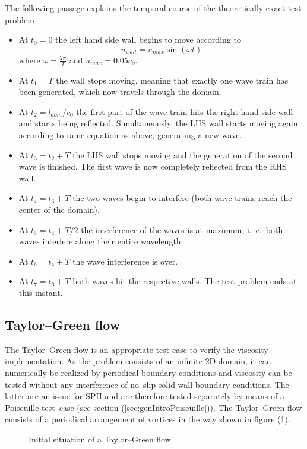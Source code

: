 \documentclass{report}
\begin{document}
The following passage explains the temporal course of the theoretically exact test problem

\begin{itemize} 
\item At $t_0=0$ the left hand side wall begins to move according to 
\begin{equation}
  u_{\mathit{wall}}=u_{\mathit{max}}\sin(\omega t) 
\end{equation}
  where $\omega=\frac{2\pi}{T}$ and $u_{\mathit{max}}=0.05 c_0$.


\item At $t_1=T$ the wall stops moving, meaning that exactly one wave train has been generated, which now travels through the domain.

\item At $t_2=l_{\mathit{dom}}/c_0$ the first part of the wave train hits the right hand side  wall and starts being reflected. Simultaneously, the LHS wall starts moving again according to same equation as above, generating a new wave.

\item At $t_3=t_2+T$ the LHS wall stops moving and the generation of the second wave is finished. 
The first wave is now completely reflected from the RHS wall.

\item At $t_4=t_3+T$ the two waves begin to interfere (both wave trains reach the center of the domain).

\item At $t_5=t_4+T/2$ the interference of the waves is at maximum, i.\ e.\ both waves interfere along their entire wavelength.

\item At $t_6=t_4+T$ the wave interference is over.

\item At $t_7=t_6+T$ both waves hit the respective walls. The test problem ends at this instant.
\end{itemize}



\subsection{Taylor--Green flow}
\label{sec:GenIntro_TG}
The Taylor--Green flow is an appropriate test case to verify the viscosity implementation. As the problem consists of an infinite 2D domain, it can numerically be realized by periodical boundary conditions and viscosity can be tested without any interference of no--slip solid wall boundary conditions. The latter are an issue for SPH and are therefore tested separately by means of a Poiseuille test--case (see section (\ref{sec:genIntroPoiseuille})).
The Taylor--Green flow consists of a periodical arrangement of vortices in the way shown in figure (\ref{fig:GeneralSitu_TG}).
\begin{figure}
 \centering

\label{fig:GeneralSitu_TG}
\caption[Taylor--Green flow general presentation]{Initial situation of a Taylor--Green flow}
\end{figure}
\end{document}

